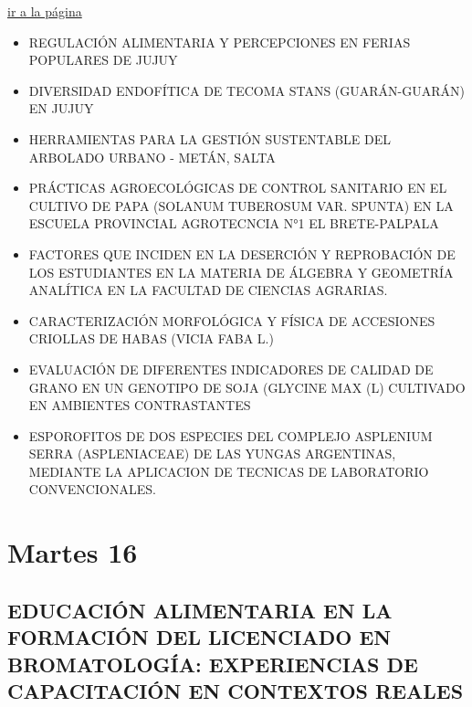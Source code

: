 \documentclass[
  spanish,
  letterpaper,
  DIV=11,
  numbers=noendperiod]{scrreprt}
\begin{document}
\begin{tcolorbox}[enhanced jigsaw, arc=.35mm, colframe=quarto-callout-note-color-frame, opacityback=0, leftrule=.75mm, titlerule=0mm, colbacktitle=quarto-callout-note-color!10!white, breakable, bottomrule=.15mm, colback=white, bottomtitle=1mm, toptitle=1mm, coltitle=black, title={Martes 23}, left=2mm, opacitybacktitle=0.6, toprule=.15mm, rightrule=.15mm]

\href{martes_23.qmd}{ir a la página}

\begin{itemize}
\item
  REGULACIÓN ALIMENTARIA Y PERCEPCIONES EN FERIAS POPULARES DE JUJUY
\item
  DIVERSIDAD ENDOFÍTICA DE TECOMA STANS (GUARÁN-GUARÁN) EN JUJUY
\item
  HERRAMIENTAS PARA LA GESTIÓN SUSTENTABLE DEL ARBOLADO URBANO - METÁN,
  SALTA
\item
  PRÁCTICAS AGROECOLÓGICAS DE CONTROL SANITARIO EN EL CULTIVO DE PAPA
  (SOLANUM TUBEROSUM VAR. SPUNTA) EN LA ESCUELA PROVINCIAL AGROTECNCIA
  N°1 EL BRETE-PALPALA
\item
  FACTORES QUE INCIDEN EN LA DESERCIÓN Y REPROBACIÓN DE LOS ESTUDIANTES
  EN LA MATERIA DE ÁLGEBRA Y GEOMETRÍA ANALÍTICA EN LA FACULTAD DE
  CIENCIAS AGRARIAS.
\item
  CARACTERIZACIÓN MORFOLÓGICA Y FÍSICA DE ACCESIONES CRIOLLAS DE HABAS
  (VICIA FABA L.)
\item
  EVALUACIÓN DE DIFERENTES INDICADORES DE CALIDAD DE GRANO EN UN
  GENOTIPO DE SOJA (GLYCINE MAX (L) CULTIVADO EN AMBIENTES CONTRASTANTES
\item
  ESPOROFITOS DE DOS ESPECIES DEL COMPLEJO ASPLENIUM SERRA
  (ASPLENIACEAE) DE LAS YUNGAS ARGENTINAS, MEDIANTE LA APLICACION DE
  TECNICAS DE LABORATORIO CONVENCIONALES.
\end{itemize}

\end{tcolorbox}


\chapter{Martes 16}\label{martes-16-1}

\section{EDUCACIÓN ALIMENTARIA EN LA FORMACIÓN DEL LICENCIADO EN
BROMATOLOGÍA: EXPERIENCIAS DE CAPACITACIÓN EN CONTEXTOS
REALES}\label{educaciuxf3n-alimentaria-en-la-formaciuxf3n-del-licenciado-en-bromatologuxeda-experiencias-de-capacitaciuxf3n-en-contextos-reales}
\end{document}
